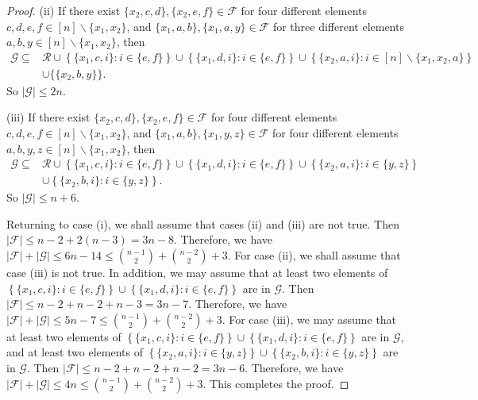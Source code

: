 \documentclass[10pt,a4paper]{amsart}
\begin{document}
\begin{proof}
(ii) If there exist $\{x_2, c, d\}, \{x_2, e, f\}\in \mathcal{F}$ for four different elements $c, d, e, f\in [n]\backslash \{x_1, x_2\}$, and $\{x_1, a, b\}, \{x_1, a, y\}\in \mathcal{F}$ for three different elements $a, b, y\in [n]\backslash \{x_1, x_2\}$, then
\begin{align*}
\mathcal{G}\subseteq&\mathcal{R}\cup\left\{\{x_1,c, i\}:  i\in \{e,f\}\right\}\cup\left\{\{x_1,d, i\}:  i\in \{e,f\}\right\}\cup\left\{\{x_2,a, i\}:  i\in [n]\backslash\{x_1,x_2,a\}\right\}\\
&\cup\{\{x_2,b, y\}\}.
\end{align*}
So $|\mathcal{G}|\leq 2 n$.

(iii) If there exist $\{x_2, c, d\}, \{x_2, e, f\}\in \mathcal{F}$ for four different elements $c, d, e, f\in [n]\backslash \{x_1, x_2\}$, and $\{x_1, a, b\}, \{x_1, y, z\}\in \mathcal{F}$ for four different elements $a, b, y, z\in [n]\backslash \{x_1, x_2\}$, then
\begin{align*}
\mathcal{G}\subseteq&\mathcal{R}\cup\left\{\{x_1,c, i\}:  i\in \{e,f\}\right\}\cup\left\{\{x_1,d, i\}:  i\in \{e,f\}\right\}\cup\left\{\{x_2,a, i\}:  i\in \{y,z\}\right\}\\
&\cup\left\{\{x_2,b, i\}:  i\in \{y,z\}\right\}.
\end{align*}
So $|\mathcal{G}|\leq n+6$.


Returning to case (i), we shall assume that cases (ii) and (iii) are not true. Then  $|\mathcal{F}|\leq n-2+2(n-3)=3n-8$. Therefore, we have
$|\mathcal{F}|+|\mathcal{G}|\leq 6n-14\leq\binom{n-1}{2}+\binom{n-2}{2}+3$.
For case (ii), we shall assume that case (iii) is not true. In addition, we may assume that at least two elements of $\left\{\{x_1,c, i\}:  i\in \{e,f\}\right\}\cup\left\{\{x_1,d, i\}:  i\in \{e,f\}\right\}$ are in $\mathcal{G}$.
Then  $|\mathcal{F}|\leq n-2+n-2+n-3=3n-7$. Therefore, we have
$|\mathcal{F}|+|\mathcal{G}|\leq 5n-7\leq\binom{n-1}{2}+\binom{n-2}{2}+3$.
For case (iii), we may assume that at least two elements of $\left\{\{x_1,c, i\}:  i\in \{e,f\}\right\}\cup\left\{\{x_1,d, i\}:  i\in \{e,f\}\right\}$ are in $\mathcal{G}$, and at least two elements of $\left\{\{x_2,a, i\}:  i\in \{y,z\}\right\}\cup\left\{\{x_2,b, i\}:  i\in \{y,z\}\right\}$ are in $\mathcal{G}$.  Then  $|\mathcal{F}|\leq n-2+n-2+n-2=3n-6$. Therefore, we have
$|\mathcal{F}|+|\mathcal{G}|\leq 4n\leq\binom{n-1}{2}+\binom{n-2}{2}+3$.
This completes the proof.
\end{proof}
\end{document}
